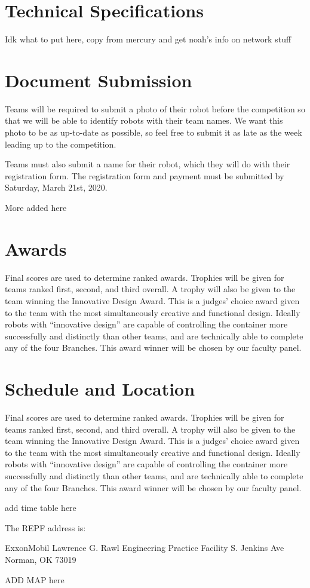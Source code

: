 \documentclass[a4paper,12pt]{article}
\begin{document}
\section{Technical Specifications}
Idk what to put here, copy from mercury and get noah’s info on network stuff

\section{Document Submission}
Teams will be required to submit a photo of their robot before the competition so that we will be able to identify robots with their team names. We want this photo to be as up-to-date as possible, so feel free to submit it as late as the week leading up to the competition. \newline

\noindent
Teams must also submit a name for their robot, which they will do with their registration form. The registration form and payment must be submitted by Saturday, March 21st, 2020. \newline

\noindent
More added here

\section{Awards}
Final scores are used to determine ranked awards. Trophies will be given for teams ranked first, second, and third overall. A trophy will also be given to the team winning the Innovative Design Award. This is a judges’ choice award given to the team with the most simultaneously creative and functional design. Ideally robots with “innovative design” are capable of controlling the container more successfully and distinctly than other teams, and are technically able to complete any of the four Branches. This award winner will be chosen by our faculty panel. 


\section{Schedule and Location}
Final scores are used to determine ranked awards. Trophies will be given for teams ranked first, second, and third overall. A trophy will also be given to the team winning the Innovative Design Award. This is a judges’ choice award given to the team with the most simultaneously creative and functional design. Ideally robots with “innovative design” are capable of controlling the container more successfully and distinctly than other teams, and are technically able to complete any of the four Branches. This award winner will be chosen by our faculty panel. \newline

\noindent
add time table here \newline

\noindent
The REPF address is: \newline 

\centering ExxonMobil Lawrence G. Rawl Engineering Practice Facility
 S. Jenkins Ave
\centering Norman, OK 73019 

ADD MAP here
\end{document}
